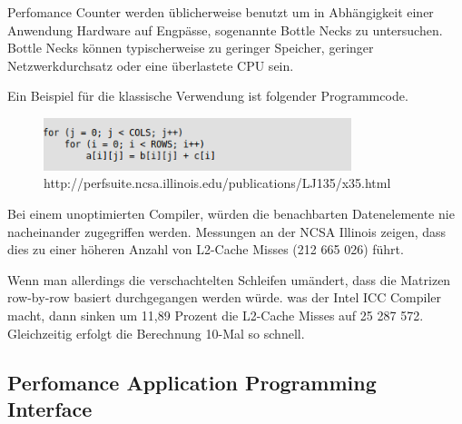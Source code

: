 Perfomance Counter werden üblicherweise benutzt um in Abhängigkeit einer Anwendung Hardware auf Engpässe, sogenannte Bottle Necks zu untersuchen. Bottle Necks können typischerweise zu geringer Speicher, geringer Netzwerkdurchsatz oder eine überlastete CPU sein. \cite{HPC} 

Ein Beispiel für die klassische Verwendung ist folgender Programmcode.

\begin{figure}[ht]
	\centering
	\includegraphics[width=0.8\textwidth]{graphic/Code.png}
	\caption{http://perfsuite.ncsa.illinois.edu/publications/LJ135/x35.html}
	\label{fig3}
\end{figure}

Bei einem unoptimierten Compiler, würden die benachbarten Datenelemente nie nacheinander zugegriffen werden. Messungen an der NCSA Illinois zeigen, dass dies zu einer höheren Anzahl von L2-Cache Misses (212 665 026) führt.


Wenn man allerdings die verschachtelten Schleifen umändert, dass die Matrizen row-by-row basiert durchgegangen werden würde. was der Intel ICC Compiler macht, dann sinken um 11,89 Prozent die L2-Cache Misses auf 25 287 572. Gleichzeitig erfolgt die Berechnung 10-Mal so schnell.
\cite{CacheUnfriendly}


\subsection{Perfomance Application Programming Interface}

